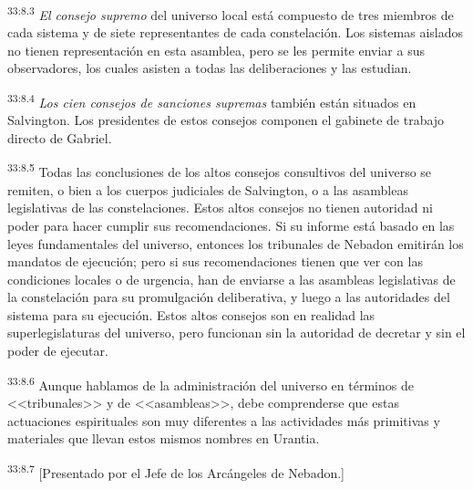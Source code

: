 \par
\textsuperscript{33:8.3} \textit{El consejo supremo} del universo local está compuesto de tres miembros de cada sistema y de siete representantes de cada constelación. Los sistemas aislados no tienen representación en esta asamblea, pero se les permite enviar a sus observadores, los cuales asisten a todas las deliberaciones y las estudian.

\par
\textsuperscript{33:8.4} \textit{Los cien consejos de sanciones supremas} también están situados en Salvington. Los presidentes de estos consejos componen el gabinete de trabajo directo de Gabriel.

\par
\textsuperscript{33:8.5} Todas las conclusiones de los altos consejos consultivos del universo se remiten, o bien a los cuerpos judiciales de Salvington, o a las asambleas legislativas de las constelaciones. Estos altos consejos no tienen autoridad ni poder para hacer cumplir sus recomendaciones. Si su informe está basado en las leyes fundamentales del universo, entonces los tribunales de Nebadon emitirán los mandatos de ejecución; pero si sus recomendaciones tienen que ver con las condiciones locales o de urgencia, han de enviarse a las asambleas legislativas de la constelación para su promulgación deliberativa, y luego a las autoridades del sistema para su ejecución. Estos altos consejos son en realidad las superlegislaturas del universo, pero funcionan sin la autoridad de decretar y sin el poder de ejecutar.

\par
\textsuperscript{33:8.6} Aunque hablamos de la administración del universo en términos de <<tribunales>> y de <<asambleas>>, debe comprenderse que estas actuaciones espirituales son muy diferentes a las actividades más primitivas y materiales que llevan estos mismos nombres en Urantia.

\par
\textsuperscript{33:8.7} [Presentado por el Jefe de los Arcángeles de Nebadon.]